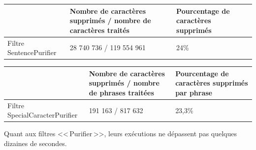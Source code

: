 \documentclass[11pt]{article}
\begin{document}
\begin{center}
\begin{tabular}{|M{4cm}|M{5cm}|M{6cm}|}
   \hline
    \, &Nombre de caract\`{e}res supprim\'{e}s / nombre de caract\`{e}res trait\'{e}s & Pourcentage de caract\`{e}res supprim\'{e}s \tabularnewline
   \hline
    Filtre SentencePurifier & 28 740 736 / 119 554 961 & 24\% \tabularnewline
   \hline
\end{tabular}
\end{center}


\begin{center}
\begin{tabular}{|M{4cm}|M{5cm}|M{6cm}|}
   \hline
    \, &Nombre de caract\`{e}res supprim\'{e}s / nombre de phrases trait\'{e}es & Pourcentage de caract\`{e}res supprim\'{e}s par phrase\tabularnewline
   \hline
    Filtre SpecialCaracterPurifier & 191 163 / 817 632 & 23,3\% \tabularnewline
   \hline
\end{tabular}
\end{center}

Quant aux filtres <<\,Purifier\,>>, leurs ex\'{e}cutions ne d\'{e}passent pas quelques dizaines de secondes.



\end{document}

